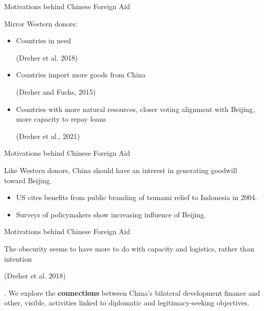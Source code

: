 \documentclass{beamer}
\begin{document}


\begin{frame}{Motivations behind Chinese Foreign Aid}


Mirror Western donors:

\begin{itemize}
    \item Countries in need \begin{footnotesize} (Dreher et al. 2018) \end{footnotesize}
    \item Countries import more goods from China \begin{footnotesize} (Dreher and Fuchs, 2015) \end{footnotesize}
    \item Countries with more natural resources, closer voting alignment with Beijing, more capacity to repay loans \begin{footnotesize} (Dreher et al., 2021) \end{footnotesize}
\end{itemize}

\end{frame}

\begin{frame}{Motivations behind Chinese Foreign Aid}

Like Western donors, China should have an interest in generating goodwill toward Beijing.

\begin{itemize}
    \item US cites benefits from public branding of tsunami relief to Indonesia in 2004.
    \item Surveys of policymakers show increasing influence of Beijing.
\end{itemize}

\end{frame}

\begin{frame}{Motivations behind Chinese Foreign Aid}

The obscurity seems to have more to do with capacity and logistics, rather than intention \begin{footnotesize} (Dreher et al. 2018) \end{footnotesize}. We
explore the \textbf{connections }between China’s bilateral development finance and other, visible,
activities linked to diplomatic and legitimacy-seeking objectives. 

\end{frame}
\end{document}
